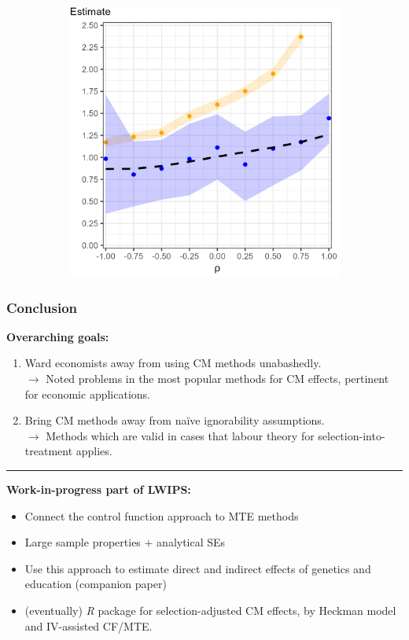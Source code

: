 \documentclass[dvipsnames]{beamer} %
\begin{document}
\begin{frame}[noframenumbering]
\begin{figure}[h!]
\begin{subfigure}[c]{0.475\textwidth}
            \includegraphics[width=\textwidth]{
                ../programs/simulations/sim-output/rho-indirecteffect-bias.png}
        \end{subfigure}
    \end{figure}
\end{frame}
\begin{frame}
    \frametitle{Conclusion}
    \textbf{Overarching goals:}
    \begin{enumerate}
        \item Ward economists away from using CM methods unabashedly. \\ 
        $\to$ Noted problems in the most popular methods for CM effects, pertinent for economic applications.
        \item Bring CM methods away from na\"ive ignorability assumptions. \\
        $\to$ Methods which are valid in cases that labour theory for selection-into-treatment applies.
    \end{enumerate}
    \par\noindent\rule{\textwidth}{0.4pt}
    \pause
    \textbf{Work-in-progress part of LWIPS:}
    \begin{itemize}
        \item Connect the control function approach to MTE methods
        \item Large sample properties $+$ analytical SEs
        \item Use this approach to estimate direct and indirect effects of genetics and education (companion paper)
        \item (eventually) \textit{R} package for selection-adjusted CM effects, by Heckman model and IV-assisted CF/MTE.
    \end{itemize}
\end{frame}
\end{document}
